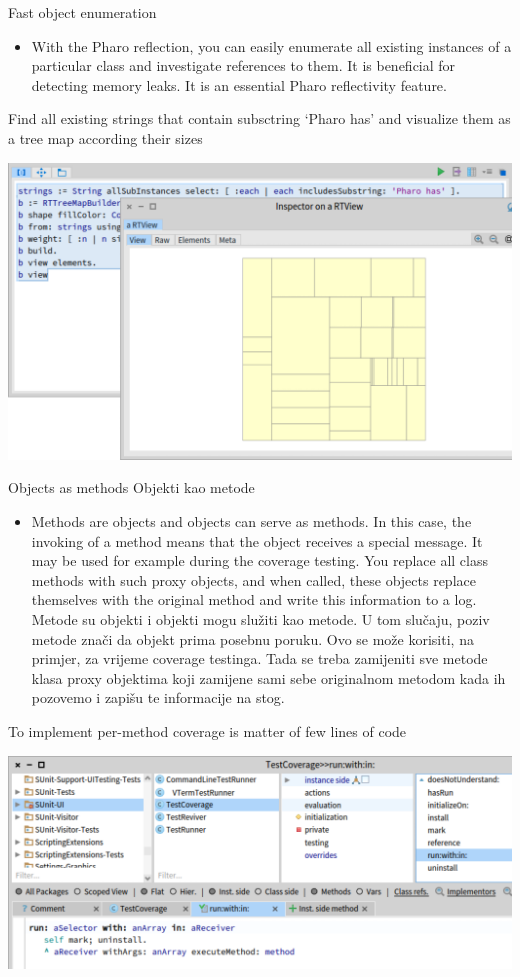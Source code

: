 \documentclass{beamer}
\begin{document}
\begin{frame}{Fast object enumeration}
\begin{itemize}
    \item With the Pharo reflection, you can easily enumerate all existing instances of a particular class and investigate references to them. It is beneficial for detecting memory leaks. It is an essential Pharo reflectivity feature.
\end{itemize}
\begin{block}{}
Find all existing strings that contain subsctring ‘Pharo has’ and visualize them as a tree map according their sizes
\end{block}
\includegraphics[width=0.5\linewidth]{instances.png}
\end{frame}

\begin{frame}{Objects as methods Objekti kao metode}
\begin{itemize}
    \item Methods are objects and objects can serve as methods. In this case, the invoking of a method means that the object receives a special message. It may be used for example during the coverage testing. You replace all class methods with such proxy objects, and when called, these objects replace themselves with the original method and write this information to a log.
    Metode su objekti i objekti mogu služiti kao metode. U tom slučaju, poziv metode znači da objekt prima posebnu poruku. Ovo se može korisiti, na primjer, za vrijeme coverage testinga. Tada se treba zamijeniti sve metode klasa proxy objektima koji zamijene sami sebe originalnom metodom kada ih pozovemo i zapišu te informacije na stog. 
\end{itemize}
\begin{block}{}
To implement per-method coverage is matter of few lines of code
\end{block}
\includegraphics[width=0.5\linewidth]{methods.png}
\end{frame}
\end{document}
